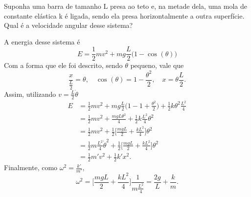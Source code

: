 \documentclass[phsyicsII_notes.tex]{subfiles}
\begin{document}
\begin{example}
	Suponha uma barra de tamanho L presa ao teto e, na metade dela, uma mola de constante elástica k é ligada, sendo ela presa horizontalmente a outra superfície.
	Qual é a velocidade angular desse sistema?

	A energia desse sistema é
	\[
		E = \frac{1}{2}mv^{2} + mg \frac{L}{2}\biggl(1-\cos^{}{(\theta )}\biggr)
	\]
	Com a forma que ele foi descrito, sendo \(\theta \) pequeno, vale que
	\[
		\frac{x}{\frac{L}{2}} = \theta,\quad \cos^{}{(\theta )} = 1 -\frac{\theta^{2}}{2},\quad x = \theta \frac{L}{2}.
	\]
	Assim, utilizando \(v = \frac{L}{2}\dot\theta \)
	\begin{align*}
		E & = \frac{1}{2}mv^{2} + mg \frac{L}{2}\biggl(1 - 1 + \frac{\theta ^{2}}{2}\biggr) + \frac{1}{2}k\theta^{2}\frac{L^{2}}{4} \\
		  & = \frac{1}{2}mv^{2} + \frac{mgL\theta ^{2}}{4} + \frac{1}{2}k \frac{L^{2}}{4}\theta^{2}                                 \\
		  & = \frac{1}{2}mv^{2} + \frac{1}{2}\biggl[\frac{mgL}{2} + \frac{kL^{2}}{4}\biggr]\theta^{2}                               \\
		  & = \frac{1}{2}m \frac{L^{2}}{4}\dot \theta ^{2} + \frac{1}{2}\biggl[\frac{mgL}{2}+ \frac{kL^{2}}{4}\biggr]\theta^{2}     \\
		  & = \frac{1}{2}m'v^{2} + \frac{1}{2}k'x^{2}.
	\end{align*}
	Finalmente, como \(\omega^{2} = \frac{k'}{m'}\),
	\[
		\omega^{2} = \biggl[\frac{mgL}{2}+ \frac{kL^{2}}{4}\biggr]\frac{1}{m \frac{L^{2}}{4}} = \frac{2g}{L} + \frac{k}{m}.
	\]
\end{example}
\end{document}
